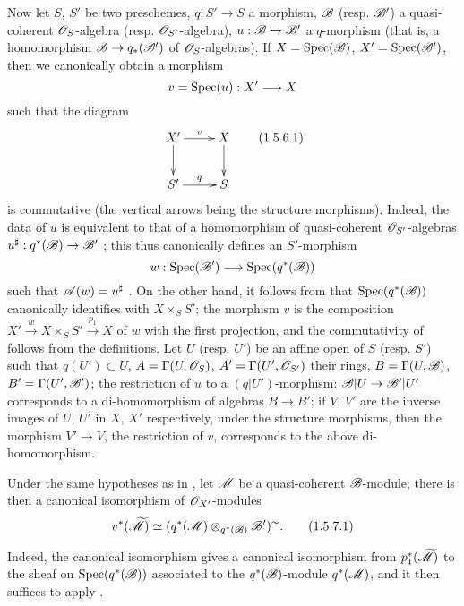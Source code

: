 \begin{env}[1.5.6]
\label{II.1.5.6}
Now let $S$, $S'$ be two preschemes, $q:S'\to S$ a morphism, $\mathscr{B}$ (resp. $\mathscr{B}'$) a quasi-coherent $\mathscr{O}_S$-algebra (resp. $\mathscr{O}_{S'}$-algebra), $u:\sh{B}\to\sh{B}'$ a $q$-morphism (that is, a homomorphism $\sh{B}\to q_*(\sh{B}')$ of $\mathscr{O}_S$-algebras).
If $X=\operatorname{Spec}(\mathscr{B})$, $X'=\operatorname{Spec}(\mathscr{B}')$, then we canonically obtain a morphism
\[
  v=\Spec(u):X'\to X
\]
such that the diagram
\[
\label{II.1.5.6.1}
  \xymatrix{
    X'\ar[r]^-{v}\ar[d] & X\ar[d]\\
    S'\ar[r]^-{q} & S
  }
  \tag{1.5.6.1}
\]
is commutative (the vertical arrows being the structure morphisms).
Indeed, the data of $u$ is equivalent to that of a homomorphism of quasi-coherent $\mathscr{O}_{S'}$-algebras $u^\sharp:q^*(\sh{B})\to\sh{B}'$ ; this thus canonically defines an $S'$-morphism
\[
  w:\Spec(\sh{B}')\to\Spec(q^*(\sh{B}))
\]
such that $\mathscr{A}(w)=u^\sharp$ .
On the other hand, it follows from  that $\operatorname{Spec}(q^*(\mathscr{B}))$ canonically identifies with $X\times_S S'$; the morphism $v$ is the composition $X'\xrightarrow{w}X\times_S S'\xrightarrow{p_1}X$ of $w$ with the first projection, and the commutativity of  follows from the definitions.
Let $U$ (resp. $U'$) be an affine open of $S$ (resp. $S'$) such that $q(U')\subset U$, $A=\Gamma(U,\mathscr{O}_S)$, $A'=\Gamma(U',\mathscr{O}_{S'})$ their rings, $B=\Gamma(U,\mathscr{B})$, $B'=\Gamma(U',\mathscr{B}')$; the restriction of $u$ to a $(q|U')$-morphism: $\sh{B}|U\to\sh{B}'|U'$ corresponds to a di-homomorphism of algebras $B\to B'$; if $V$, $V'$ are the inverse images of $U$, $U'$ in $X$, $X'$ respectively, under the structure morphisms, then the morphism $V'\to V$, the restriction of $v$, corresponds  to the above di-homomorphism.
\end{env}

\begin{env}[1.5.7]
\label{II.1.5.7}
Under the same hypotheses as in , let $\mathscr{M}$ be a quasi-coherent $\mathscr{B}$-module; there is then a canonical isomorphism of $\mathscr{O}_{X'}$-modules
\[
\label{II.1.5.7.1}
  v^*(\widetilde{\mathscr{M}})\simeq(q^*(\mathscr{M})\otimes_{q^*(\mathscr{B})}\mathscr{B}')^\sim.
  \tag{1.5.7.1}
\]

Indeed, the canonical isomorphism  gives a canonical isomorphism from $p_1^*(\widetilde{\mathscr{M}})$ to the sheaf on $\operatorname{Spec}(q^*(\mathscr{B}))$ associated to the $q^*(\mathscr{B})$-module $q^*(\mathscr{M})$, and it then suffices to apply .
\end{env}

